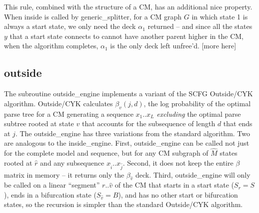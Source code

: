 \documentclass[11pt]{article}
\begin{document}
This rule, combined with the structure of a CM, has an additional nice
property. When inside is called by generic\_splitter, for a CM graph
$G$ in which state 1 is always a start state, we only need the deck
$\alpha_1$ returned -- and since all the states $y$ that a start state
connects to cannot have another parent higher in the CM, when the
algorithm completes, $\alpha_1$ is the only deck left unfree'd.
[more here]






\subsection{outside}

The subroutine outside\_engine implements a variant of the SCFG
Outside/CYK algorithm. Outside/CYK calculates $\beta_v(j,d)$, the log
probability of the optimal parse tree for a CM generating a sequence
$x_1..x_L$ \emph{excluding} the optimal parse subtree rooted at state
$v$ that accounts for the subsequence of length $d$ that ends at $j$.
The outside\_engine has three variations from the standard algorithm.
Two are analogous to the inside\_engine. First, outside\_engine can be
called not just for the complete model and sequence, but for any CM
subgraph of $\hat{M}$ states rooted at $\hat{r}$ and any subsequence
$x_{\hat{i}}..x_{\hat{j}}$. Second, it does not keep the entire $\beta$
matrix in memory -- it returns only the $\beta_{\hat{v}}$ deck. Third,
outside\_engine will only be called on a linear ``segment''
$r..\hat{v}$ of the CM that starts in a start state ($S_r = S$), ends
in a bifurcation state ($S_{\hat{v}} = B$), and has no other start or
bifurcation states, so the recursion is simpler than the standard
Outside/CYK algorithm.
\end{document}
